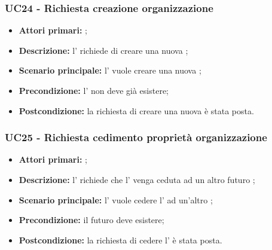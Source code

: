 \documentclass[../analisi-dei-requisiti]{subfiles}
\begin{document}
\subsubsection{UC24 - Richiesta creazione organizzazione}
\label{subsub:UC24}

\begin{itemize}
  \item \textbf{Attori primari:} ;
  \item \textbf{Descrizione:} l'  richiede di creare una nuova ;
  \item \textbf{Scenario principale:} l'  vuole creare una nuova ;
  \item \textbf{Precondizione:} l'  non deve già esistere;
  \item \textbf{Postcondizione:} la richiesta di creare una nuova  è stata posta.

\end{itemize}

\subsubsection{UC25 - Richiesta cedimento proprietà organizzazione}
\label{subsub:UC25}

\begin{itemize}
  \item \textbf{Attori primari:} ;
  \item \textbf{\textbf{Descrizione:}} l'  richiede che l' venga ceduta ad un altro futuro ;
  \item \textbf{\textbf{Scenario principale:}} l'  vuole cedere l' ad un'altro ;
  \item \textbf{Precondizione:} il futuro  deve esistere;
  \item \textbf{Postcondizione:} la richiesta di cedere l' è stata posta.

\end{itemize}

\end{document}
